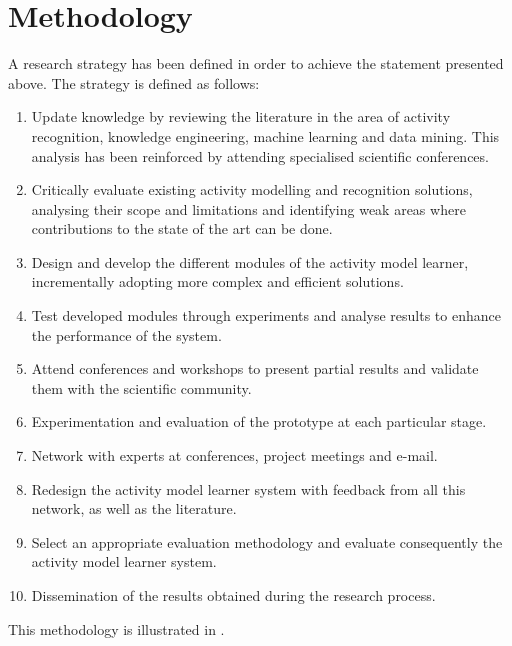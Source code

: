 \section{Methodology}

A research strategy has been defined in order to achieve the statement presented
above. The strategy is defined as follows:

\begin{enumerate}
    \item Update knowledge by reviewing the literature in the area of activity recognition, knowledge engineering, machine learning and data mining. This analysis has been reinforced by attending specialised scientific conferences.
    \item Critically evaluate existing activity modelling and recognition solutions, analysing their scope and limitations and identifying weak areas where contributions to the state of the art can be done.
    \item Design and develop the different modules of the activity model learner, incrementally adopting more complex and efficient solutions.
    \item Test developed modules through experiments and analyse results to enhance the performance of the system.
    \item Attend conferences and workshops to present partial results and validate them with the scientific community.
    \item Experimentation and evaluation of the prototype at each particular
    stage.
    \item Network with experts at conferences, project meetings and e-mail.
    \item Redesign the activity model learner system with feedback from all this network, as well as the literature.
    \item Select an appropriate evaluation methodology and evaluate consequently the activity model learner system.
    \item Dissemination of the results obtained during the research process.
\end{enumerate}

This methodology is illustrated in .

